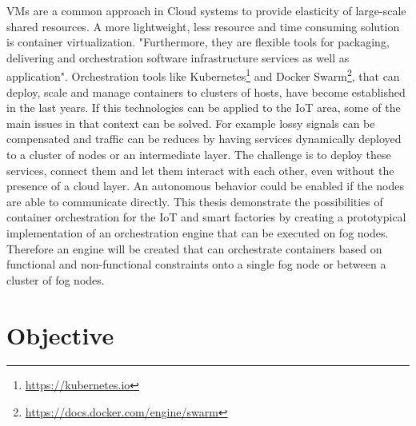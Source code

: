\acp{VM} are a common approach in Cloud systems to provide elasticity of large-scale shared resources.\autocite[cf.][p. 117]{Pahl:2016}
A more lightweight, less resource and time consuming solution is container virtualization.
"Furthermore, they are flexible tools for packaging, delivering and orchestration software infrastructure services as well as application"\autocite[p. 117]{Pahl:2016}.
Orchestration tools like Kubernetes\footnote{\url{https://kubernetes.io}} and Docker Swarm\footnote{\url{https://docs.docker.com/engine/swarm}}, that can deploy, scale and manage containers to clusters of hosts, have become established in the last years.
If this technologies can be applied to the \ac{IoT} area, some of the main issues in that context can be solved.
For example lossy signals can be compensated and traffic can be reduces by having services dynamically deployed to a cluster of nodes or an intermediate layer.
The challenge is to deploy these services, connect them and let them interact with each other, even without the presence of a cloud layer.
An autonomous behavior could be enabled if the nodes are able to communicate directly.
This thesis demonstrate the possibilities of container orchestration for the \ac{IoT} and smart factories by creating a prototypical implementation of an orchestration engine that can be executed on fog nodes.
Therefore an engine will be created that can orchestrate containers based on functional and non-functional constraints onto a single fog node or between a cluster of fog nodes.


\section{Objective}



